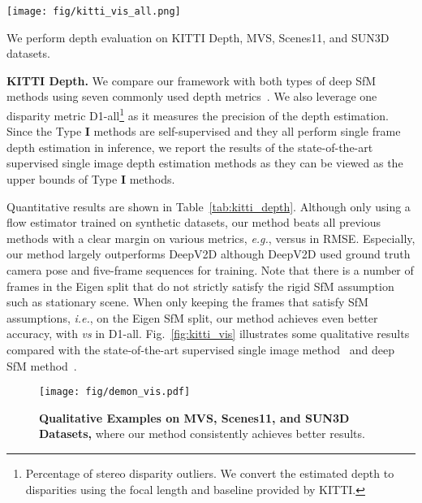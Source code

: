 \documentclass[final]{cvpr}
\def\eg{\emph{e.g.}}
\def\ie{\emph{i.e.}}
\begin{document}
\begin{figure*}[t]
\vspace{-2mm}
\begin{center}
   \texttt{[image: fig/kitti\_vis\_all.png]}
\end{center}
\vspace{-3mm}
   \caption{\small \textbf{Qualitative Results on the KITTI Dataset.} The yellow circles and boxes in the top row highlight tiny poles which are captured more accurately by our method.  }
\label{fig:kitti_vis}
\vspace{-4mm}
\end{figure*}



We perform depth evaluation on KITTI Depth, MVS, Scenes11, and SUN3D datasets.

\textbf{KITTI Depth.} We compare our framework with both types of deep SfM methods using seven commonly used depth metrics~\cite{eigen2014depth}. We also leverage one disparity metric D1-all\footnote{Percentage of stereo disparity outliers. We convert the estimated depth to disparities using the focal length and baseline provided by KITTI.} as it measures the precision of the depth estimation. Since the Type \textbf{I} methods are self-supervised and they all perform single frame depth estimation in inference, we report the results of the state-of-the-art supervised single image depth estimation methods \cite{fu2018deep,yin2019enforcing} as they can be viewed as the  upper bounds of Type \textbf{I} methods.

Quantitative results are shown in Table~\ref{tab:kitti_depth}. Although only using a flow estimator trained on synthetic datasets, our method beats all previous methods with a clear margin on various metrics, \eg,  versus  in RMSE. Especially, our method largely outperforms DeepV2D although DeepV2D used ground truth camera pose and five-frame sequences for training. Note that there is a number of frames in the Eigen split that do not strictly satisfy the rigid SfM assumption such as stationary scene. When only keeping the frames that satisfy SfM assumptions, \ie, on the Eigen SfM split, our method achieves even better accuracy, with  \emph{vs}  in D1-all. Fig.~\ref{fig:kitti_vis} illustrates some qualitative results compared with the state-of-the-art supervised single image method~\cite{fu2018deep} and deep SfM method~\cite{teed2018deepv2d}.

\begin{figure}[t]
\begin{center}
   \texttt{[image: fig/demon\_vis.pdf]}
\end{center}
\vspace{-3mm}
   \caption{\small \textbf{Qualitative Examples on MVS, Scenes11, and SUN3D Datasets,} where our method consistently achieves better results.}
\label{fig:demon_vis}
\vspace{-4mm}
\end{figure}
\end{document}
